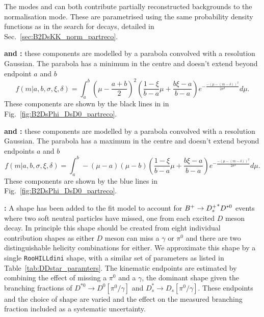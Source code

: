 The modes \decay{\Bp}{\Dsp\Dstarzb} and \decay{\Bp}{\Dssp\Dzb} can both contribute partially reconstructed backgrounds to the \decay{\Bp}{\Dsp\Dzb} normalisation mode. These are parametrised using the same probability density functions as in the search for \decay{\Bp}{\Ds\Kp\Km} decays, detailed in Sec.~\ref{sec:B2DsKK_norm_partreco}.

\begin{description}
\item \textbf{\decay{\Bp}{(\decay{\Dssp}{\Dsp[\piz]})\Dzb} and \decay{\Bp}{\Dsp(\decay{\Dstarzb}{\Dzb[\piz]})}:} these components are modelled by a parabola convolved with a resolution Gaussian. The parabola has a minimum in the centre and doesn't extend beyond endpoint $a$ and $b$
\begin{equation}
f(m|a,b,\sigma,\xi, \delta) = \int_{a}^{b}\left(\mu-\frac{a+b}{2}\right)^{2} \left( \frac{1-\xi}{b-a}\mu + \frac{b\xi-a}{b-a} \right) e^{-\frac{-(\mu-(m-\delta))^{2}}{2\sigma^{2}}} d\mu.
\end{equation}
These components are shown by the black lines in in Fig.~\ref{fig:B2DsPhi_DsD0_partreco}.

\item \textbf{\decay{\Bp}{(\decay{\Dssp}{\Dsp[\Pgamma]})\Dzb} and \decay{\Bp}{\Dsp(\decay{\Dstarzb}{\Dzb[\Pgamma]})}:} these components are modelled by a parabola convolved with a resolution Gaussian. The parabola has a maximum in the centre and doesn't extend beyond endpoints $a$ and $b$
\begin{equation}
f(m|a,b,\sigma,\xi, \delta) = \int_{a}^{b} -(\mu-a)(\mu-b)\left( \frac{1-\xi}{b-a}\mu + \frac{b\xi-a}{b-a} \right) e^{-\frac{-(\mu-(m-\delta))^{2}}{2\sigma^{2}}} d\mu.
\end{equation}
These components are shown by the blue lines in Fig.~\ref{fig:B2DsPhi_DsD0_partreco}.

\item \textbf{\decay{\Bp}{\Dssp\Dstarzb}:} A shape has been added to the fit model to account for ${B}^+ \rightarrow {\ensuremath{{D}^+_{s}}}^{*} D^{*0}$ events where two soft neutral particles have missed, one from each excited $D$ meson decay. In principle this shape should be created from eight individual contribution shapes as either $D$ meson can miss a $\gamma$ or $\pi^{0}$ and there are two distinguishable helicity combinations for either. We approximate this shape by a single \texttt{RooHILLdini} shape, with a similar set of parameters as listed in Table~\ref{tab:DDstar_paramters}. The kinematic endpoints are estimated by combining the effect of missing a $\pi^{0}$ and a $\gamma$, the dominant shape given the branching fractions of $D^{*0} \to D^{0} [\pi^{0}/\gamma]$ and $D_{s}^{*} \to D_{s} [\pi^{0}/\gamma]$. These endpoints and the choice of shape are varied and the effect on the measured branching fraction included as a systematic uncertainty. 

\end{description}


